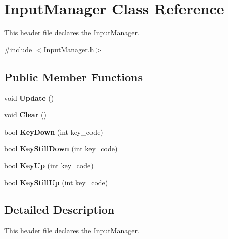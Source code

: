 \hypertarget{class_input_manager}{}\section{Input\+Manager Class Reference}
\label{class_input_manager}


This header file declares the \hyperlink{class_input_manager}{Input\+Manager}.  




{\ttfamily \#include $<$Input\+Manager.\+h$>$}

\subsection*{Public Member Functions}
\begin{DoxyCompactItemize}
\item 
\hypertarget{class_input_manager_aa5480931dba2720e7d80dd00a53adae0}{}void {\bfseries Update} ()\label{class_input_manager_aa5480931dba2720e7d80dd00a53adae0}

\item 
\hypertarget{class_input_manager_a18ae2fda358d7865fd0f8549cf5e567b}{}void {\bfseries Clear} ()\label{class_input_manager_a18ae2fda358d7865fd0f8549cf5e567b}

\item 
\hypertarget{class_input_manager_a0c2a0e6f88b8c750c2e6a6144c6754cc}{}bool {\bfseries Key\+Down} (int key\+\_\+code)\label{class_input_manager_a0c2a0e6f88b8c750c2e6a6144c6754cc}

\item 
\hypertarget{class_input_manager_ae64fce71b03055787db3b88ceac7a8ae}{}bool {\bfseries Key\+Still\+Down} (int key\+\_\+code)\label{class_input_manager_ae64fce71b03055787db3b88ceac7a8ae}

\item 
\hypertarget{class_input_manager_a5a6d53999798af40b2af8dddfc57db46}{}bool {\bfseries Key\+Up} (int key\+\_\+code)\label{class_input_manager_a5a6d53999798af40b2af8dddfc57db46}

\item 
\hypertarget{class_input_manager_a21c6050d4cf1d7533c42c4719d10921e}{}bool {\bfseries Key\+Still\+Up} (int key\+\_\+code)\label{class_input_manager_a21c6050d4cf1d7533c42c4719d10921e}

\end{DoxyCompactItemize}


\subsection{Detailed Description}
This header file declares the \hyperlink{class_input_manager}{Input\+Manager}. 

